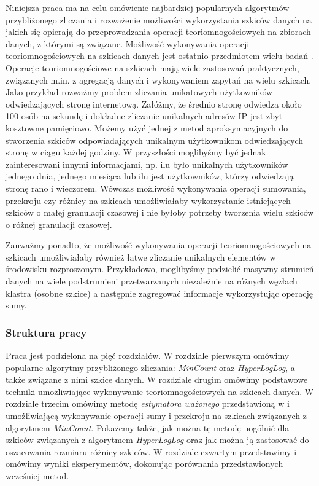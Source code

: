 Niniejsza praca ma na celu omówienie najbardziej popularnych algorytmów przybliżonego zliczania i rozważenie możliwości wykorzystania szkiców danych
na jakich się opierają do przeprowadzania operacji teoriomnogościowych na zbiorach danych, z którymi są związane.  Możliwość wykonywania operacji teoriomnogościowych na szkicach danych jest ostatnio przedmiotem wielu badań \cite{ting} \cite{oertl} \cite{adroll}.
Operacje teoriomnogościowe na szkicach mają wiele zastosowań praktycznych,  związanych m.in. z agregacją danych i  wykonywaniem  zapytań na wielu szkicach. Jako przykład rozważmy problem zliczania unikatowych użytkowników odwiedzających stronę internetową. Załóżmy, że średnio stronę odwiedza około 100 osób na sekundę i dokładne zliczanie unikalnych adresów IP jest zbyt kosztowne pamięciowo. Możemy użyć jednej z metod aproksymacyjnych do stworzenia szkiców odpowiadających unikalnym użytkownikom odwiedzających stronę  w ciągu każdej godziny. W przyszłości moglibyśmy być jednak zainteresowani innymi informacjami, np. ilu było
unikalnych użytkowników jednego dnia, jednego miesiąca
lub ilu jest użytkowników, którzy odwiedzają stronę rano i wieczorem.   
Wówczas możliwość wykonywania operacji sumowania, przekroju czy różnicy na szkicach umożliwiałaby wykorzystanie istniejących szkiców o małej granulacji czasowej i nie byłoby potrzeby tworzenia wielu szkiców o różnej granulacji czasowej. 

Zauważmy ponadto, że możliwość wykonywania operacji 
teoriomnogościowych na szkicach umożliwiałaby również
łatwe zliczanie unikalnych elementów w środowisku rozproszonym. Przykładowo, moglibyśmy podzielić masywny strumień danych na wiele podstrumieni przetwarzanych niezależnie na różnych węzłach klastra (osobne szkice)
a następnie zagregować informacje wykorzystując operację sumy.

\subsubsection{Struktura pracy}
Praca jest podzielona na pięć rozdziałów. W rozdziale pierwszym omówimy popularne algorytmy przybliżonego zliczania: \textit{MinCount} oraz \textit{HyperLogLog}, a także związane z nimi szkice danych. 
W rozdziale drugim omówimy podstawowe techniki 
umożliwiające wykonywanie  teoriomnogościowych na szkicach danych. W rozdziale trzecim omówimy metodę \textit{estymatora ważonego} przedstawioną w \cite{ting} i umożliwiającą wykonywanie operacji sumy i przekroju na szkicach związanych z algorytmem \textit{MinCount}. Pokażemy także, jak można tę metodę uogólnić dla szkiców związanych z algorytmem \textit{HyperLogLog} oraz jak można ją zastosować do oszacowania rozmiaru różnicy szkiców. W rozdziale czwartym przedstawimy i omówimy wyniki eksperymentów, dokonując porównania przedstawionych wcześniej metod.